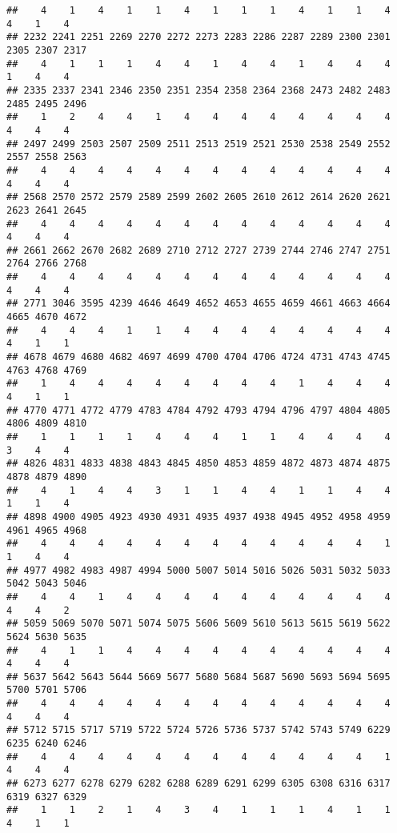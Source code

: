 \documentclass[
]{article}
\begin{document}
\begin{verbatim}
##    4    1    4    1    1    4    1    1    1    4    1    1    4    4    1    4 
## 2232 2241 2251 2269 2270 2272 2273 2283 2286 2287 2289 2300 2301 2305 2307 2317 
##    4    1    1    1    4    4    1    4    4    1    4    4    4    1    4    4 
## 2335 2337 2341 2346 2350 2351 2354 2358 2364 2368 2473 2482 2483 2485 2495 2496 
##    1    2    4    4    1    4    4    4    4    4    4    4    4    4    4    4 
## 2497 2499 2503 2507 2509 2511 2513 2519 2521 2530 2538 2549 2552 2557 2558 2563 
##    4    4    4    4    4    4    4    4    4    4    4    4    4    4    4    4 
## 2568 2570 2572 2579 2589 2599 2602 2605 2610 2612 2614 2620 2621 2623 2641 2645 
##    4    4    4    4    4    4    4    4    4    4    4    4    4    4    4    4 
## 2661 2662 2670 2682 2689 2710 2712 2727 2739 2744 2746 2747 2751 2764 2766 2768 
##    4    4    4    4    4    4    4    4    4    4    4    4    4    4    4    4 
## 2771 3046 3595 4239 4646 4649 4652 4653 4655 4659 4661 4663 4664 4665 4670 4672 
##    4    4    4    1    1    4    4    4    4    4    4    4    4    4    1    1 
## 4678 4679 4680 4682 4697 4699 4700 4704 4706 4724 4731 4743 4745 4763 4768 4769 
##    1    4    4    4    4    4    4    4    4    1    4    4    4    4    1    1 
## 4770 4771 4772 4779 4783 4784 4792 4793 4794 4796 4797 4804 4805 4806 4809 4810 
##    1    1    1    1    4    4    4    1    1    4    4    4    4    3    4    4 
## 4826 4831 4833 4838 4843 4845 4850 4853 4859 4872 4873 4874 4875 4878 4879 4890 
##    4    1    4    4    3    1    1    4    4    1    1    4    4    1    1    4 
## 4898 4900 4905 4923 4930 4931 4935 4937 4938 4945 4952 4958 4959 4961 4965 4968 
##    4    4    4    4    4    4    4    4    4    4    4    4    1    1    4    4 
## 4977 4982 4983 4987 4994 5000 5007 5014 5016 5026 5031 5032 5033 5042 5043 5046 
##    4    4    1    4    4    4    4    4    4    4    4    4    4    4    4    2 
## 5059 5069 5070 5071 5074 5075 5606 5609 5610 5613 5615 5619 5622 5624 5630 5635 
##    4    1    1    4    4    4    4    4    4    4    4    4    4    4    4    4 
## 5637 5642 5643 5644 5669 5677 5680 5684 5687 5690 5693 5694 5695 5700 5701 5706 
##    4    4    4    4    4    4    4    4    4    4    4    4    4    4    4    4 
## 5712 5715 5717 5719 5722 5724 5726 5736 5737 5742 5743 5749 6229 6235 6240 6246 
##    4    4    4    4    4    4    4    4    4    4    4    4    1    4    4    4 
## 6273 6277 6278 6279 6282 6288 6289 6291 6299 6305 6308 6316 6317 6319 6327 6329 
##    1    1    2    1    4    3    4    1    1    1    4    1    1    4    1    1 

\end{verbatim}
\end{document}
